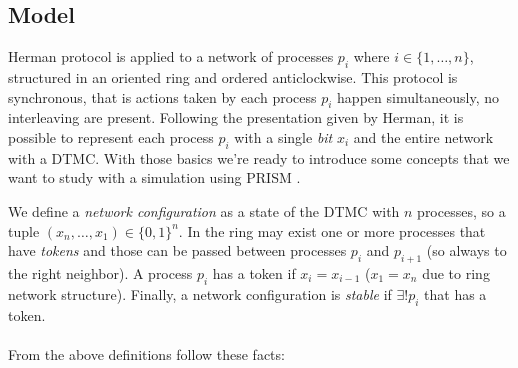 \subsection{Model}

Herman protocol \cite{Her90} is applied to a network of processes
$p_i$ where $i \in \{1,\ldots, n\}$, structured in an oriented ring
and ordered anticlockwise. This protocol is synchronous, that is
actions taken by each process $p_i$ happen simultaneously, no
interleaving are present. Following the presentation given by Herman,
it is possible to represent each process $p_i$ with a single
\emph{bit} $x_i$ and the entire network with a DTMC. With those basics
we're ready to introduce some concepts that we want to study with a
simulation using PRISM \cite{KNP11}.

We define a \emph{network configuration} as a state of the DTMC with
$n$ processes, so a tuple $(x_n, \ldots, x_1) \in \{0,1\}^n$. In the
ring may exist one or more processes that have \emph{tokens} and those
can be passed between processes $p_i$ and $p_{i+1}$ (so always to the
right neighbor). A process $p_i$ has a token if $x_i = x_{i-1}$ ($x_1
= x_n$ due to ring network structure). Finally, a network
configuration is \emph{stable} if $\exists! p_i$ that has a token.
\\\\
From the above definitions follow these facts:
